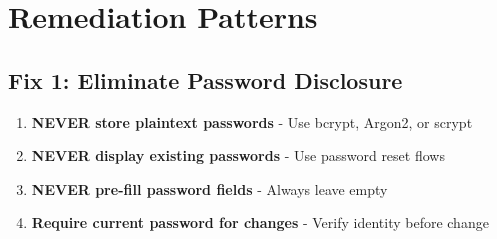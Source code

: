 \documentclass[11pt,letterpaper]{article}
\begin{document}
\section{Remediation Patterns}

\subsection{Fix 1: Eliminate Password Disclosure}

\begin{criticalbox}
\begin{enumerate}
  \item \textbf{NEVER store plaintext passwords} - Use bcrypt, Argon2, or scrypt
  \item \textbf{NEVER display existing passwords} - Use password reset flows
  \item \textbf{NEVER pre-fill password fields} - Always leave empty
  \item \textbf{Require current password for changes} - Verify identity before change
\end{enumerate}
\end{criticalbox}
\end{document}
